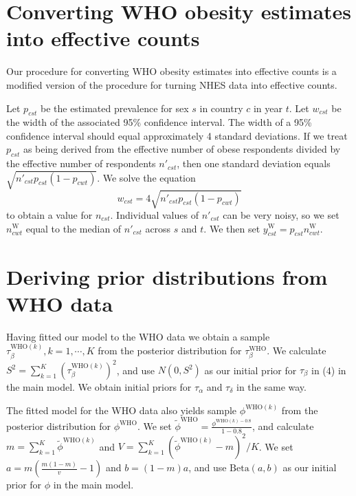 \documentclass[10pt,letterpaper]{article}
\begin{document}
\hypertarget{converting-who-obesity-estimates-into-effective-counts}{%
\section{Converting WHO obesity estimates into effective
counts}\label{converting-who-obesity-estimates-into-effective-counts}}

Our procedure for converting WHO obesity estimates into effective counts
is a modified version of the procedure for turning NHES data into
effective counts.

Let \(p_{cst}\) be the estimated prevalence for sex \(s\) in country
\(c\) in year \(t\). Let \(w_{cst}\) be the width of the associated 95\%
confidence interval. The width of a 95\% confidence interval should
equal approximately 4 standard deviations. If we treat \(p_{cst}\) as
being derived from the effective number of obese respondents divided by
the effective number of respondents \(n'_{cst}\), then one standard
deviation equals \(\sqrt{n'_{cst} p_{cst} (1 - p_{cwt})}\). We solve the
equation \begin{equation}
  w_{cst} = 4 \sqrt{n'_{cst} p_{cst} (1 - p_{cwt})}
\end{equation} to obtain a value for \(n_{cst}\). Individual values of
\(n'_{cst}\) can be very noisy, so we set \(n_{cwt}^{\text{W}}\) equal
to the median of \(n'_{cst}\) across \(s\) and \(t\). We then set
\(y_{cst}^{\text{W}} = p_{cst} n_{cwt}^{\text{W}}\).

\hypertarget{deriving-prior-distributions-from-who-data}{%
\section{Deriving prior distributions from WHO
data}\label{deriving-prior-distributions-from-who-data}}

Having fitted our model to the WHO data we obtain a sample
\(\tau_{\beta}^{\text{WHO}(k)}, k = 1, \cdots, K\) from the posterior
distribution for \(\tau_{\beta}^{\text{WHO}}\). We calculate
\(S^2 = \sum_{k=1}^K (\tau_{\beta}^{\text{WHO}(k)})^2\), and use
\(N(0, S^2)\) as our initial prior for \(\tau_{\beta}\) in (4) in the
main model. We obtain initial priors for \(\tau_{\alpha}\) and
\(\tau_{\delta}\) in the same way.

The fitted model for the WHO data also yields sample
\(\phi^{\text{WHO}(k)}\) from the posterior distribution for
\(\phi^{\text{WHO}}\). We set
\(\tilde{\phi}^{\text{WHO}} = \frac{\phi^{\text{WHO}(k) - 0.8}}{1 - 0.8}\),
and calculate \(m = \sum_{k = 1}^K \tilde{\phi}^{\text{WHO}(k)}\) and
\(V = \sum_{k = 1}^K (\tilde{\phi}^{\text{WHO}(k)} - m)^2 / K\). We set
\(a = m \left(\frac{m(1-m)}{v} - 1\right)\) and \(b = (1-m) a\), and use
\(\text{Beta}(a, b)\) as our initial prior for \(\phi\) in the main
model.
\end{document}
